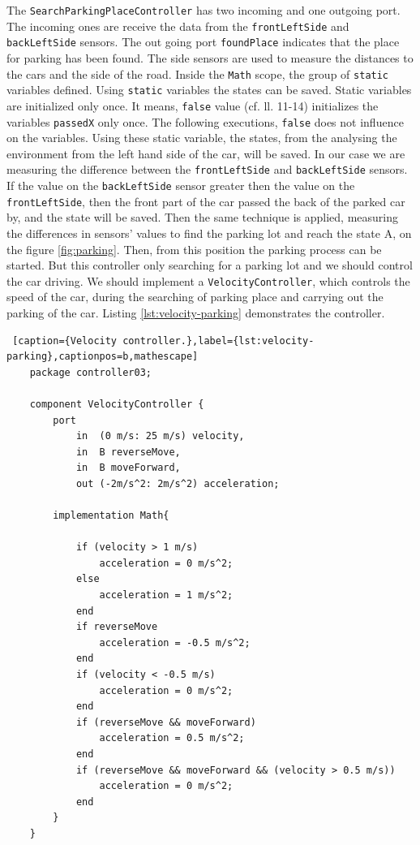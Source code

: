 The \texttt{SearchParkingPlaceController} has two incoming and one outgoing port. The incoming ones are receive the data from the \texttt{frontLeftSide} and \texttt{backLeftSide} sensors. The out going port \texttt{foundPlace} indicates that the place for parking has been found. The side sensors are used to measure the distances to the cars and the side of the road. Inside the \texttt{Math} scope, the group of \texttt{static} variables defined. Using \texttt{static} variables the states can be saved. Static variables are initialized only once. It means, \texttt{false} value (cf. ll. 11-14) initializes the variables \texttt{passedX} only once. The following executions, \texttt{false} does not influence on the variables. Using these static variable, the states, from the analysing the environment from the left hand side of the car, will be saved. In our case we are measuring the difference between the \texttt{frontLeftSide} and \texttt{backLeftSide} sensors. If the value on the \texttt{backLeftSide} sensor greater then the value on the \texttt{frontLeftSide}, then the front part of the car passed the back of the parked car by, and the state will be saved. Then the same technique is applied, measuring the differences in sensors' values to find the parking lot and reach the state A, on the figure \ref{fig:parking}. Then, from this position the parking process can be started. But this controller only searching for a parking lot and we should control the car driving. We should implement a \texttt{VelocityController}, which controls the speed of the car, during the searching of parking place and carrying out the parking of the car. Listing \ref{lst:velocity-parking} demonstrates the controller. 
\bigskip
\begin{lstlisting} [caption={Velocity controller.},label={lst:velocity-parking},captionpos=b,mathescape]
    package controller03;

    component VelocityController {
        port                                    
            in  (0 m/s: 25 m/s) velocity,
            in  B reverseMove,
            in  B moveForward,
            out (-2m/s^2: 2m/s^2) acceleration; 
    
        implementation Math{                    
    
            if (velocity > 1 m/s)
                acceleration = 0 m/s^2;
            else
                acceleration = 1 m/s^2;
            end
            if reverseMove
                acceleration = -0.5 m/s^2;
            end
            if (velocity < -0.5 m/s)
                acceleration = 0 m/s^2;
            end
            if (reverseMove && moveForward)
                acceleration = 0.5 m/s^2;
            end
            if (reverseMove && moveForward && (velocity > 0.5 m/s))
                acceleration = 0 m/s^2;
            end
        }
    }
\end{lstlisting}
